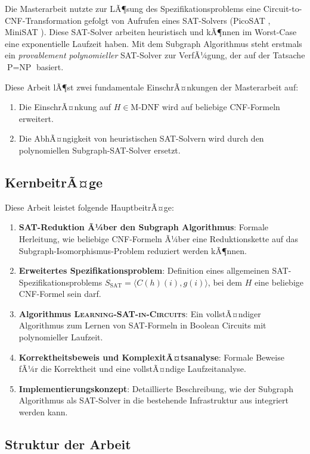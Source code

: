 ﻿\documentclass[a4paper,12pt]{article}
\theoremstyle{definition}
\begin{document}
Die Masterarbeit nutzte zur LÃ¶sung des Spezifikationsproblems eine Circuit-to-CNF-Transformation gefolgt von Aufrufen eines SAT-Solvers (PicoSAT \cite{Bie08}, MiniSAT \cite{ES04}). Diese SAT-Solver arbeiten heuristisch und kÃ¶nnen im Worst-Case eine exponentielle Laufzeit haben. Mit dem Subgraph Algorithmus \cite{Epp26} steht erstmals ein \textit{provablement polynomieller} SAT-Solver zur VerfÃ¼gung, der auf der Tatsache $\text{P} = \text{NP}$ basiert.

Diese Arbeit lÃ¶st zwei fundamentale EinschrÃ¤nkungen der Masterarbeit auf:
\begin{enumerate}
    \item Die EinschrÃ¤nkung auf $H \in \text{M-DNF}$ wird auf beliebige CNF-Formeln erweitert.
    \item Die AbhÃ¤ngigkeit von heuristischen SAT-Solvern wird durch den polynomiellen Subgraph-SAT-Solver ersetzt.
\end{enumerate}

\subsection{KernbeitrÃ¤ge}

Diese Arbeit leistet folgende HauptbeitrÃ¤ge:
\begin{enumerate}
    \item \textbf{SAT-Reduktion Ã¼ber den Subgraph Algorithmus}: Formale Herleitung, wie beliebige CNF-Formeln Ã¼ber eine Reduktionskette auf das Subgraph-Isomorphismus-Problem reduziert werden kÃ¶nnen.
    \item \textbf{Erweitertes Spezifikationsproblem}: Definition eines allgemeinen SAT-Spezifi\-kationsproblems $S_{\text{SAT}} = \langle C(h)(i), g(i) \rangle$, bei dem $H$ eine beliebige CNF-Formel sein darf.
    \item \textbf{Algorithmus \textsc{Learning-SAT-in-Circuits}}: Ein vollstÃ¤ndiger Algorithmus zum Lernen von SAT-Formeln in Boolean Circuits mit polynomieller Laufzeit.
    \item \textbf{Korrektheitsbeweis und KomplexitÃ¤tsanalyse}: Formale Beweise fÃ¼r die Korrektheit und eine vollstÃ¤ndige Laufzeitanalyse.
    \item \textbf{Implementierungskonzept}: Detaillierte Beschreibung, wie der Subgraph Algorithmus als SAT-Solver in die bestehende Infrastruktur aus \cite{Epp13} integriert werden kann.
\end{enumerate}

\subsection{Struktur der Arbeit}
\end{document}
